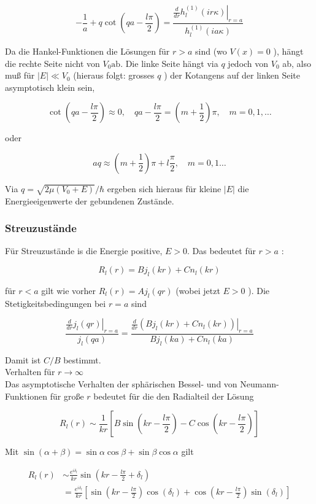 \documentclass[10pt, letterpaper]{article}
\begin{document}
$$
-\frac{1}{a}+q \cot \left(q a-\frac{l \pi}{2}\right)=\frac{\left.\frac{d}{d r} h_{l}^{(1)}(i r \kappa)\right|_{r=a}}{h_{l}^{(1)}(i a \kappa)}
$$

Da die Hankel-Funktionen die Lösungen für $r>a$ sind (wo $V(x)=0$ ), hängt die rechte Seite nicht von $V_{0} \mathrm{ab}$. Die linke Seite hängt via $q$ jedoch von $V_{0}$ ab, also muß für $|E| \ll V_{0}$ (hieraus folgt: grosses $q$ ) der Kotangens auf der linken Seite asymptotisch klein sein,

$$
\cot \left(q a-\frac{l \pi}{2}\right) \approx 0, \quad q a-\frac{l \pi}{2}=\left(m+\frac{1}{2}\right) \pi, \quad m=0,1, \ldots
$$

oder

$$
a q \approx\left(m+\frac{1}{2}\right) \pi+l \frac{\pi}{2}, \quad m=0,1 \ldots
$$

Via $q=\sqrt{2 \mu\left(V_{0}+E\right)} / \hbar$ ergeben sich hieraus für kleine $|E|$ die Energieeigenwerte der gebundenen Zustände.

\subsubsection*{Streuzustände}
Für Streuzustände is die Energie positive, $E>0$. Das bedeutet für $r>a$ :

$$
R_{l}(r)=B j_{l}(k r)+C n_{l}(k r)
$$

für $r<a$ gilt wie vorher $R_{l}(r)=A j_{l}(q r)$ (wobei jetzt $E>0$ ). Die Stetigkeitsbedingungen bei $r=a$ sind

$$
\frac{\left.\frac{d}{d r} j_{l}(q r)\right|_{r=a}}{j_{l}(q a)}=\frac{\left.\frac{d}{d r}\left(B j_{l}(k r)+C n_{l}(k r)\right)\right|_{r=a}}{B j_{l}(k a)+C n_{l}(k a)}
$$

Damit ist $C / B$ bestimmt.\\
Verhalten für $r \rightarrow \infty$\\
Das asymptotische Verhalten der sphärischen Bessel- und von Neumann-Funktionen für große $r$ bedeutet für die den Radialteil der Lösung

$$
R_{l}(r) \sim \frac{1}{k r}\left[B \sin \left(k r-\frac{l \pi}{2}\right)-C \cos \left(k r-\frac{l \pi}{2}\right)\right]
$$

Mit $\sin (\alpha+\beta)=\sin \alpha \cos \beta+\sin \beta \cos \alpha$ gilt

$$
\begin{aligned}
R_{l}(r) & \sim \frac{e^{i \delta_{l}}}{k r} \sin \left(k r-\frac{l \pi}{2}+\delta_{l}\right) \\
& =\frac{e^{i \delta_{l}}}{k r}\left[\sin \left(k r-\frac{l \pi}{2}\right) \cos \left(\delta_{l}\right)+\cos \left(k r-\frac{l \pi}{2}\right) \sin \left(\delta_{l}\right)\right]
\end{aligned}
$$
\end{document}
